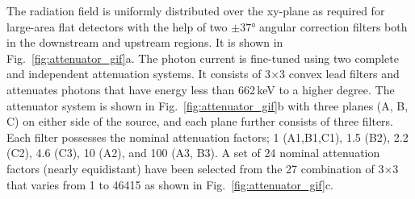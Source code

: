 The radiation field is uniformly distributed over the xy-plane as required for large-area flat detectors with the help of two $\pm \ang{37}$ angular correction filters both in the downstream and upstream regions. It is shown in Fig.~\ref{fig:attenuator_gif}a. The photon current is fine-tuned using two complete and independent attenuation systems. It consists of 3$\times$3 convex lead filters and attenuates photons that have energy less than 662\,keV to a higher degree. The attenuator system is shown in Fig.~\ref{fig:attenuator_gif}b with three planes (A, B, C) on either side of the source, and each plane further consists of three filters. Each filter possesses the nominal attenuation factors; 1 (A1,B1,C1), 1.5 (B2), 2.2 (C2), 4.6 (C3), 10 (A2), and 100 (A3, B3). A set of 24 nominal attenuation factors (nearly equidistant) have been selected from the 27 combination of 3$\times$3 that varies from 1 to 46415 as shown in Fig.~\ref{fig:attenuator_gif}c.  

